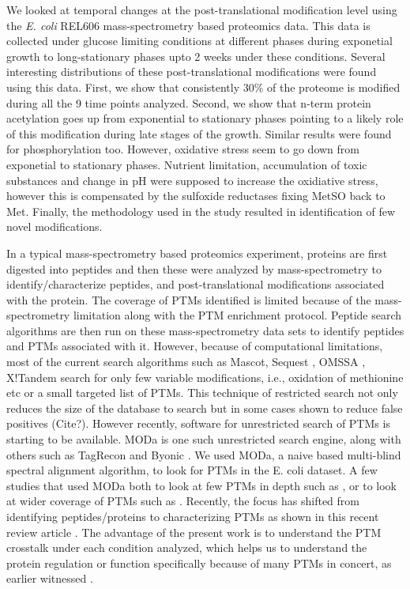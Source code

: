 \documentclass[12pt]{article}
\begin{document}
We looked at temporal changes at the post-translational modification level using the \emph{E. coli} REL606 mass-spectrometry based proteomics data. This data is collected under glucose limiting conditions at different phases during exponetial growth to long-stationary phases upto 2 weeks under these conditions. Several interesting distributions of these post-translational modifications were found using this data. First, we show that consistently 30\% of the proteome is modified during all the 9 time points analyzed. Second, we show that n-term protein acetylation goes up from exponential to stationary phases pointing to a likely role of this modification during late stages of the growth. Similar results were found for phosphorylation too. However, oxidative stress seem to go down from exponetial to stationary phases. Nutrient limitation, accumulation of toxic substances and change in pH were supposed to increase the oxidiative stress, however this is compensated by the sulfoxide reductases fixing MetSO back to Met. Finally, the methodology used in the study resulted in identification of few novel modifications.

In a typical mass-spectrometry based proteomics experiment, proteins are first digested into peptides and then these were analyzed by mass-spectrometry to identify/characterize peptides, and post-translational modifications associated with the protein. The coverage of PTMs identified is limited because of the mass-spectrometry limitation along with the PTM enrichment protocol. Peptide search algorithms are then run on these mass-spectrometry data sets to identify peptides and PTMs associated with it. However, because of computational limitations, most of the current search algorithms such as Mascot\cite{Perkinsetal1999}, Sequest \cite{Engetal1994}, OMSSA \cite{Geeretal2004}, X!Tandem \cite{CraigBeavis2004} search for only few variable modifications, i.e., oxidation of methionine etc or a small targeted list of PTMs. This technique of restricted search not only reduces the size of the database to search but in some cases shown to reduce false positives (Cite?). However recently, software for unrestricted search of PTMs is starting to be available. MODa \cite{Naetal2012} is one such unrestricted search engine, along with others such as TagRecon\cite{Dasarietal2010} and Byonic \cite{Bernetal2012}. We used MODa, a naive based multi-blind spectral alignment algorithm, to look for PTMs in the E. coli dataset. A few studies that used MODa both to look at few PTMs in depth such as \cite{Kimetal2014}, or to look at wider coverage of PTMs such as \cite{Liuetal2013}. Recently, the focus has shifted from identifying peptides/proteins to characterizing PTMs as shown in this recent review article \cite{OlsenMann2013}. The advantage of the present work is to understand the PTM crosstalk under each condition analyzed, which helps us to understand the protein regulation or function specifically because of many PTMs in concert, as earlier witnessed \cite{Pengetal2014}.
\end{document}

